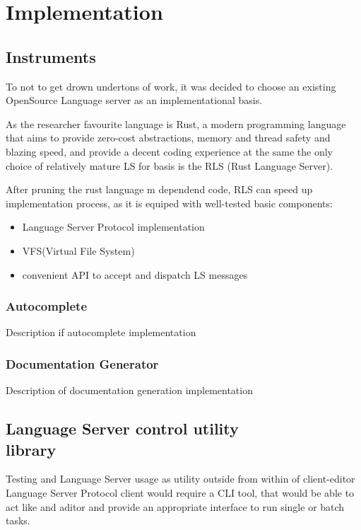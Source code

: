 \chapter{Implementation}
\label{chap:impl}

\section{Instruments}
\label{sec:impl:instruments}
To not to get drown undertons of work, it was decided to choose an existing OpenSource
Language server as an implementational basis.

As the researcher favourite language is Rust, a modern programming language that aims
to provide zero-cost abstractions, memory and thread safety and blazing speed,
and provide a decent coding experience at the same
the only choice of relatively mature LS for basis is the RLS (Rust Language Server).

After pruning the rust language m dependend code, RLS can speed up implementation process,
as it is equiped with well-tested basic components:
\begin{itemize}
    \item Language Server Protocol implementation
    \item VFS(Virtual File System)
    \item convenient API to accept and dispatch LS messages
\end{itemize}

\subsection{Autocomplete}
\label{sec:impl:ls_mod:autocomplete}
Description if autocomplete implementation

\subsection{Documentation Generator}
\label{sec:impl:ls_mod:docgen}
Description of documentation generation implementation

\section{Language Server control utility\\ library}
\label{sec:impl:ls_control_api}
Testing and Language Server usage as utility outside from within of client-editor Language Server Protocol client would require
a CLI tool, that would be able to act like and aditor and provide an appropriate interface to run single or batch tasks.